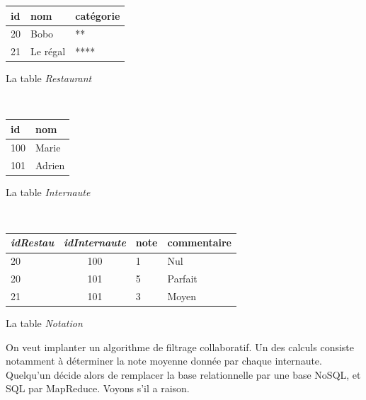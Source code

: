 \documentclass[10pt,a4paper]{article}
\newcommand{\cle}[1]{\textbf{#1}}
\def\fk#1{\textit{#1}}
\def\tble#1{\textit{#1}}
\begin{document}
\vspace*{0.2cm}
\begin{small}
\begin{minipage}[b]{4cm}
\begin{tabular}{l|l|l}
\cle{id} & nom & catégorie\\
\hline
20 & Bobo & ** \\
21 & Le régal & ****\\
\hline
\end{tabular}

\centerline{La table \tble{Restaurant}}
\end{minipage} \hspace*{0.5cm} \
\begin{minipage}[b]{2cm}
\begin{tabular}{l|l}
\cle{id} &  nom  \\
\hline
100 & Marie \\
101 & Adrien \\
\hline
\end{tabular}
\centerline{La table \tble{Internaute}}
\end{minipage} \hspace*{1cm} \
\begin{minipage}[b]{3cm}
\begin{tabular}{l|c|l|l}
\cle{\fk{idRestau}} & \cle{\fk{idInternaute}}  & note & commentaire \\
\hline
20  & 100  & 1 & Nul\\
20 & 101  & 5 & Parfait\\
21 & 101  & 3 & Moyen\\
\hline
\end{tabular}

\centerline{La table \tble{Notation}}
\end{minipage}
\end{small}

\vspace*{0.2cm}

On veut implanter  un algorithme de filtrage collaboratif. Un des calculs consiste notamment
à déterminer la note moyenne donnée par chaque internaute. 
Quelqu'un décide alors de remplacer la base relationnelle par une base NoSQL, et SQL par MapReduce.
Voyons s'il a raison.
\end{document}

